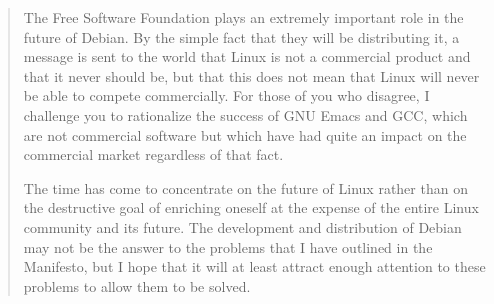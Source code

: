 \ifdefined\eng
\begin{quote}
The Free Software Foundation plays an extremely important role in the future of Debian. By the simple fact that they will be distributing it, a message is sent to the world that Linux is not a commercial product and that it never should be, but that this does not mean that Linux will never be able to compete commercially. For those of you who disagree, I challenge you to rationalize the success of GNU Emacs and GCC, which are not commercial software but which have had quite an impact on the commercial market regardless of that fact.

The time has come to concentrate on the future of Linux rather than on the destructive goal of enriching oneself at the expense of the entire Linux community and its future. The development and distribution of Debian may not be the answer to the problems that I have outlined in the Manifesto, but I hope that it will at least attract enough attention to these problems to allow them to be solved.
\end{quote}
\fi

